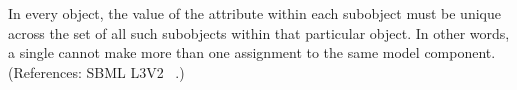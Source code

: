 In every \Event object, the value of the attribute  within
each \EventAssignment subobject must be unique across the set of all such
\EventAssignment subobjects within that particular \Event object.  In other
words, a single \Event cannot make more than one assignment to the same
model component.  (References: SBML L3V2 ~.)
